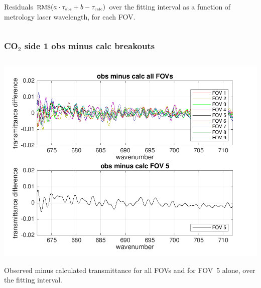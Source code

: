 \documentclass[10pt]{beamer}
\begin{document}
\begin{frame}
\begin{columns}[t]
\begin{column}{0.5\textwidth}
Residuals $\mbox{\small RMS}(a\cdot\tau_{\mbox{\tiny obs}} + b - \tau_{\mbox{\tiny calc}})$ over the fitting
interval as a function of metrology laser wavelength, for each FOV.

\end{column}
\end{columns}
\end{frame}
\begin{frame}
\frametitle{CO$_2$ side 1 obs minus calc breakouts}
\begin{columns}[t]
\begin{column}{0.5\textwidth}
  \begin{centering}
  \includegraphics[width=\textwidth]{01-07_pfl_s1_CO2/CO2_breakout_1.png}
  \end{centering}\vspace{3mm}

Observed minus calculated transmittance for all FOVs and for FOV~5
alone, over the fitting interval.


\end{column}
\end{columns}
\end{frame}
\end{document}
